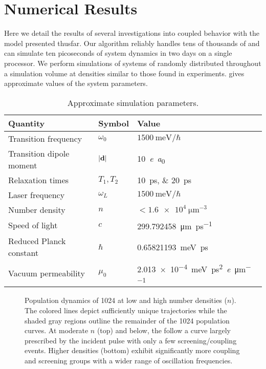 \section{Numerical Results}
Here we detail the results of several investigations into coupled \qd{} behavior with the model presented thusfar.
Our algorithm reliably handles tens of thousands of \qds{} and can simulate ten picoseconds of system dynamics in two days on a single processor.
We perform simulations of systems of \qds{} randomly distributed throughout a simulation volume at densities similar to those found in experiments.
 gives approximate values of the system parameters.

\begin{table}
  \begin{ruledtabular}
    \begin{tabular}{lll}
      Quantity                 & Symbol         & Value                        \\ \hline
      Transition frequency     & $\omega_0$     & $\SI{1500}{\milli\eV}/\hbar$ \\
      Transition dipole moment & $\abs{\vb{d}}$ & \SI{10}{\elementarycharge\bohr} \\
      Relaxation times         & $T_{1}, T_{2}$ & \SIlist{10;20}{\pico\second} \\
      Laser frequency          & $\omega_L$     & $\SI{1500}{\milli\eV}/\hbar$ \\
      Number density           & $n$            & $< \SI{1.6e4}{\micro\meter\tothe{-3}}$ \\
      \hline
      Speed of light           & $c$            & \SI{299.792458}{\micro\meter\per\pico\second} \\
      Reduced Planck constant  & $\hbar$        & \SI{0.65821193}{\milli\eV \pico\second} \\
      Vacuum permeability      & $\mu_0$        & \SI{2.013e-4}{\milli\eV \pico\second\squared \per \elementarycharge \per \micro\meter}
    \end{tabular}
  \end{ruledtabular}
  \caption{\label{table:parameters}Approximate simulation parameters.}
\end{table}

\begin{figure}
  
  \caption{\label{fig:density stats}Population dynamics of 1024 \qds{} at low and high number densities ($n$).
  The colored lines depict sufficiently unique trajectories while the shaded gray regions outline the remainder of the 1024 population curves.
  At moderate $n$ (top) and below, the \qds{} follow a curve largely prescribed by the incident pulse with only a few screening/coupling events.
  Higher densities (bottom) exhibit significantly more coupling and screening groups with a wider range of oscillation frequencies.
}
\end{figure}

